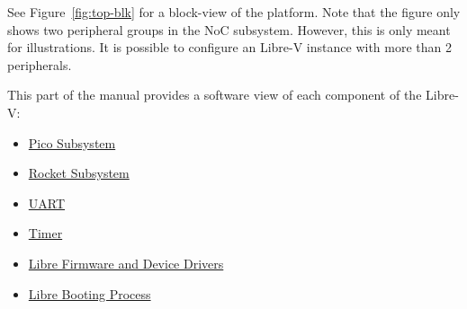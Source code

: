 See Figure~\ref{fig:top-blk} for a block-view of the platform. Note that the figure only shows two peripheral groups in the NoC subsystem. However, this is only meant for illustrations. It is possible to configure an Libre-V instance with more than 2 peripherals.

This part of the manual provides a software view of each  component of the Libre-V:  
\begin{itemize}
    \item \hyperref[ch:sw-pico-sys]{Pico Subsystem}
    \item \hyperref[ch:sw-rocket-sys]{Rocket Subsystem}
    \item \hyperref[ch:sw-uart]{UART}
    \item \hyperref[ch:sw-timer]{Timer}
    \item \hyperref[ch:compiling-firmware]{Libre Firmware and Device Drivers}
    \item \hyperref[ch:libre-boot]{Libre Booting Process}     
\end{itemize}

\newpage
